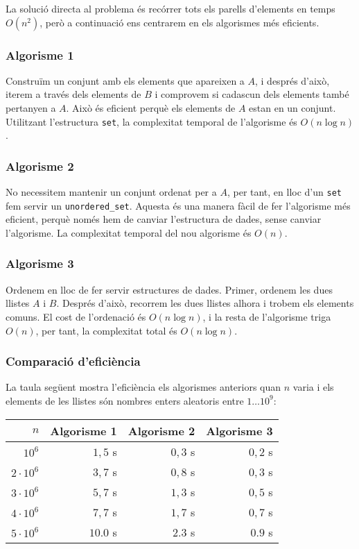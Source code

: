 La solució directa al problema és
recórrer tots els parells d'elements en temps $O(n^2)$,
però a continuació ens centrarem
en els algorismes més eficients.

\subsubsection{Algorisme 1}

Construïm un conjunt amb els elements que apareixen a $A$,
i després d'això, iterem a través dels elements
de $B$ i comprovem si cadascun dels elements també
pertanyen a $A$.
Això és eficient perquè els elements de $A$
estan en un conjunt.
Utilitzant l'estructura \texttt{set},
la complexitat temporal de l'algorisme és $O(n \log n)$.

\subsubsection{Algorisme 2}

No necessitem mantenir un conjunt ordenat per a $A$,
per tant, en lloc d'un \texttt{set}
fem servir un \texttt{unordered\_set}.
Aquesta és una manera fàcil de fer l'algorisme
més eficient, perquè només hem de canviar
l'estructura de dades, sense canviar l'algorisme.
La complexitat temporal del nou algorisme és $O(n)$.

\subsubsection{Algorisme 3}

Ordenem en lloc de fer servir estructures de dades.
Primer, ordenem les dues llistes $A$ i $B$.
Després d'això, recorrem les dues llistes
alhora i trobem els elements comuns.
El cost de l'ordenació és $O(n \log n)$,
i la resta de l'algorisme triga $O(n)$,
per tant, la complexitat total és $O(n \log n)$.

\subsubsection{Comparació d'eficiència}

La taula següent mostra l'eficiència
els algorismes anteriors quan $n$ varia i
els elements de les llistes són nombres enters
aleatoris entre $1 \ldots 10^9$:

\begin{centre}
\begin{tabular}{rrrr} 
$n$ & Algorisme 1 & Algorisme 2 & Algorisme 3 \\
\hline
$10^6$ & $1,5$ s & $0,3$ s & $0,2$ s \\
$2 \cdot 10^6$ & $3,7$ s & $0,8$ s & $0,3$ s \\
$3 \cdot 10^6$ & $5,7$ s & $1,3$ s & $0,5$ s \\
$4 \cdot 10^6$ & $7,7$ s & $1,7$ s & $0,7$ s \\
$5 \cdot 10^6$ & $10.0$ s & $2.3$ s & $0.9$ s \\
\end{tabular}
\end{centre}


